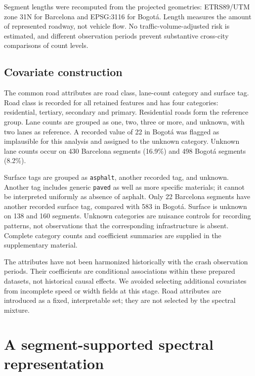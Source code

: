 \documentclass[11pt]{article}
\begin{document}
Segment lengths were recomputed from the projected geometries: ETRS89/UTM zone 31N for Barcelona and EPSG:3116 for Bogot\'a. Length measures the amount of represented roadway, not vehicle flow. No traffic-volume-adjusted risk is estimated, and different observation periods prevent substantive cross-city comparisons of count levels.

\subsection{Covariate construction}
The common road attributes are road class, lane-count category and surface tag. Road class is recorded for all retained features and has four categories: residential, tertiary, secondary and primary. Residential roads form the reference group. Lane counts are grouped as one, two, three or more, and unknown, with two lanes as reference. A recorded value of 22 in Bogot\'a was flagged as implausible for this analysis and assigned to the unknown category. Unknown lane counts occur on 430 Barcelona segments (16.9\%) and 498 Bogot\'a segments (8.2\%).

Surface tags are grouped as \texttt{asphalt}, another recorded tag, and unknown. Another tag includes generic \texttt{paved} as well as more specific materials; it cannot be interpreted uniformly as absence of asphalt. Only 22 Barcelona segments have another recorded surface tag, compared with 583 in Bogot\'a. Surface is unknown on 138 and 160 segments. Unknown categories are nuisance controls for recording patterns, not observations that the corresponding infrastructure is absent. Complete category counts and coefficient summaries are supplied in the supplementary material.

The attributes have not been harmonized historically with the crash observation periods. Their coefficients are conditional associations within these prepared datasets, not historical causal effects. We avoided selecting additional covariates from incomplete speed or width fields at this stage. Road attributes are introduced as a fixed, interpretable set; they are not selected by the spectral mixture.

\section{A segment-supported spectral representation}
\end{document}
